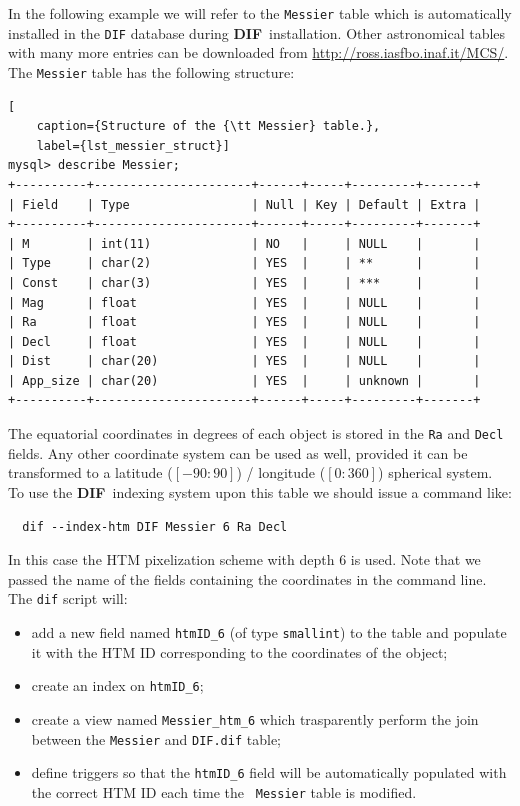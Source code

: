 \documentclass[10pt,titlepage]{article}
\newcommand{\dif}{\textbf{\small DIF}}
\begin{document}
In the following example we will refer to the {\tt Messier} table
which is automatically installed in the {\tt DIF} database during \dif\
installation. Other astronomical tables with many more entries can be
downloaded from \url{http://ross.iasfbo.inaf.it/MCS/}.
The \verb|Messier| table has the following structure:
%
\begin{lstlisting}[
    caption={Structure of the {\tt Messier} table.},
    label={lst_messier_struct}]
mysql> describe Messier;
+----------+----------------------+------+-----+---------+-------+
| Field    | Type                 | Null | Key | Default | Extra |
+----------+----------------------+------+-----+---------+-------+
| M        | int(11)              | NO   |     | NULL    |       |
| Type     | char(2)              | YES  |     | **      |       |
| Const    | char(3)              | YES  |     | ***     |       |
| Mag      | float                | YES  |     | NULL    |       |
| Ra       | float                | YES  |     | NULL    |       |
| Decl     | float                | YES  |     | NULL    |       |
| Dist     | char(20)             | YES  |     | NULL    |       |
| App_size | char(20)             | YES  |     | unknown |       |
+----------+----------------------+------+-----+---------+-------+
\end{lstlisting}
The equatorial coordinates in degrees of each object is stored in the
{\tt Ra} and {\tt Decl} fields. Any other coordinate system can be
used as well, provided it can be transformed to a latitude
($[-90:90]$) / longitude ($[0:360]$) spherical system. To use the
\dif\ indexing system upon this table we should issue a command like:
%
\begin{verbatim}
  dif --index-htm DIF Messier 6 Ra Decl
\end{verbatim}
%
In this case the HTM pixelization scheme with depth 6 is used. Note
that we passed the name of the fields containing the coordinates in
the command line. The {\tt dif} script will:
%
\begin{itemize}
\item add a new field named {\tt htmID\_6} (of type {\tt smallint}) to
  the table and populate it with the HTM ID corresponding to the
  coordinates of the object;
\item create an index on {\tt htmID\_6};
\item create a view named {\tt Messier\_htm\_6} which trasparently
  perform the join between the {\tt Messier} and {\tt DIF.dif} table;
\item define triggers so that the {\tt htmID\_6} field will be
  automatically populated with the correct HTM ID each time the {\tt
    Messier} table is modified.
\end{itemize}
\end{document}
